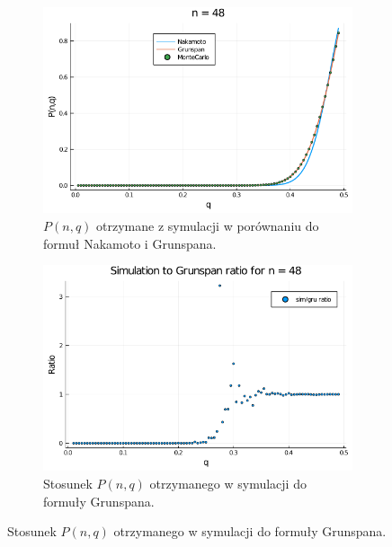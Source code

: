 \documentclass{article}
\begin{document}
        \begin{figure}[H]
            \centering
            \begin{subfigure}{0.65\textwidth}
                \includegraphics[width=\linewidth]{img/mc_n=48.png}
                \caption{$P(n,q)$ otrzymane z symulacji w porównaniu do formuł Nakamoto i Grunspana.}
            \end{subfigure}
    
            \begin{subfigure}{0.65\textwidth}
                \includegraphics[width=\linewidth]{img/mc_to_gr_n=48.png}
                \caption{Stosunek $P(n,q)$ otrzymanego w symulacji do formuły Grunspana.}
            \end{subfigure}
    

\end{figure}
\end{document}
